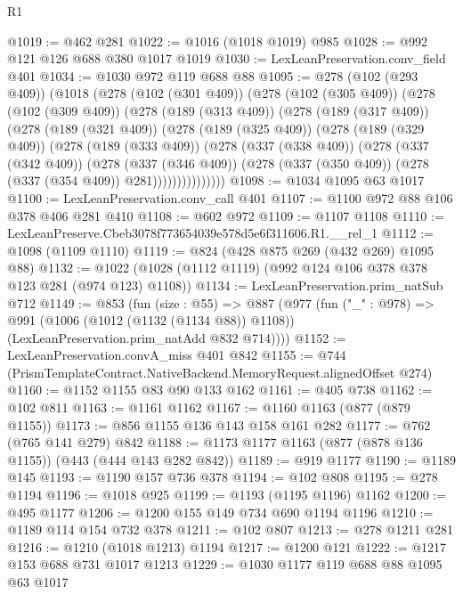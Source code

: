 \begin{lexlean}{R1}
\begin{coremodule}
@1019 := @462 @281
@1022 := @1016 (@1018 @1019) @985
@1028 := @992 @121 @126 @688 @380 @1017 @1019
@1030 := LexLeanPreservation.conv_field @401
@1034 := @1030 @972 @119 @688 @88
@1095 := @278
    (@102 (@293 @409))
    (@1018
      (@278
        (@102 (@301 @409))
        (@278
          (@102 (@305 @409))
          (@278
            (@102 (@309 @409))
            (@278
              (@189 (@313 @409))
              (@278
                (@189 (@317 @409))
                (@278
                  (@189 (@321 @409))
                  (@278
                    (@189 (@325 @409))
                    (@278
                      (@189 (@329 @409))
                      (@278
                        (@189 (@333 @409))
                        (@278
                          (@337 (@338 @409))
                          (@278
                            (@337 (@342 @409))
                            (@278
                              (@337 (@346 @409))
                              (@278 (@337 (@350 @409)) (@278 (@337 (@354 @409)) @281)))))))))))))))
@1098 := @1034 @1095 @63 @1017
@1100 := LexLeanPreservation.conv_call @401
@1107 := @1100 @972 @88 @106 @378 @406 @281 @410
@1108 := @602 @972
@1109 := @1107 @1108
@1110 := LexLeanPreserve.Cbeb3078f773654039e578d5e6f311606.R1.__rel_1
@1112 := @1098 (@1109 @1110)
@1119 := @824 (@428 @875 @269 (@432 @269) @1095 @88)
@1132 := @1022 (@1028 (@1112 @1119) (@992 @124 @106 @378 @378 @123 @281 (@974 @123) @1108))
@1134 := LexLeanPreservation.prim_natSub @712
@1149 := @853
    (fun (size : @55) =>
    @887
      (@977
        (fun ("_" : @978) =>
        @991
          (@1006 (@1012 (@1132 (@1134 @88)) @1108))
          (LexLeanPreservation.prim_natAdd @832 @714))))
@1152 := LexLeanPreservation.convA_miss @401 @842
@1155 := @744 (PrismTemplateContract.NativeBackend.MemoryRequest.alignedOffset @274)
@1160 := @1152 @1155 @83 @90 @133 @162
@1161 := @405 @738
@1162 := @102 @811
@1163 := @1161 @1162
@1167 := @1160 @1163 (@877 (@879 @1155))
@1173 := @856 @1155 @136 @143 @158 @161 @282
@1177 := @762 (@765 @141 @279) @842
@1188 := @1173 @1177 @1163 (@877 (@878 @136 @1155)) (@443 (@444 @143 @282 @842))
@1189 := @919 @1177
@1190 := @1189 @145
@1193 := @1190 @157 @736 @378
@1194 := @102 @808
@1195 := @278 @1194
@1196 := @1018 @925
@1199 := @1193 (@1195 @1196) @1162
@1200 := @495 @1177
@1206 := @1200 @155 @149 @734 @690 @1194 @1196
@1210 := @1189 @114 @154 @732 @378
@1211 := @102 @807
@1213 := @278 @1211 @281
@1216 := @1210 (@1018 @1213) @1194
@1217 := @1200 @121
@1222 := @1217 @153 @688 @731 @1017 @1213
@1229 := @1030 @1177 @119 @688 @88 @1095 @63 @1017

\end{coremodule}
\end{lexlean}
